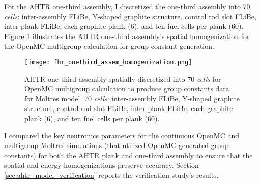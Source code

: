 For the \gls{AHTR} one-third assembly, I discretized the one-third assembly into 
70 \textit{cells}: inter-assembly \gls{FLiBe}, Y-shaped graphite structure, control 
rod slot \gls{FLiBe}, inter-plank \gls{FLiBe}, each graphite plank (6), and ten fuel 
cells per plank (60).
Figure \ref{fig:fhr_onethird_assem_homogenization} illustrates the \gls{AHTR} 
one-third assembly's spatial homogenization for the OpenMC multigroup calculation
for group constant generation. 
\begin{figure}[htbp]
    \centering
    \texttt{[image: fhr\_onethird\_assem\_homogenization.png]}
    \raggedright
    \caption{\acrfull{AHTR} one-third assembly spatially discretized into 
    70 \textit{cells} for OpenMC multigroup calculation to produce group constants 
    data for Moltres model.
    70 \textit{cells}: inter-assembly \gls{FLiBe}, Y-shaped graphite structure, control 
    rod slot \gls{FLiBe}, inter-plank \gls{FLiBe}, each graphite plank (6), and ten fuel 
    cells per plank (60).}
    \label{fig:fhr_onethird_assem_homogenization}
\end{figure}

I compared the key neutronics parameters for the continuous OpenMC and multigroup 
Moltres simulations (that utilized OpenMC generated group constants) for both the 
\gls{AHTR} plank and one-third assembly to ensure that the spatial and energy 
homogenizations preserve accuracy.
Section \ref{sec:ahtr_model_verification} reports the verification study's results.

